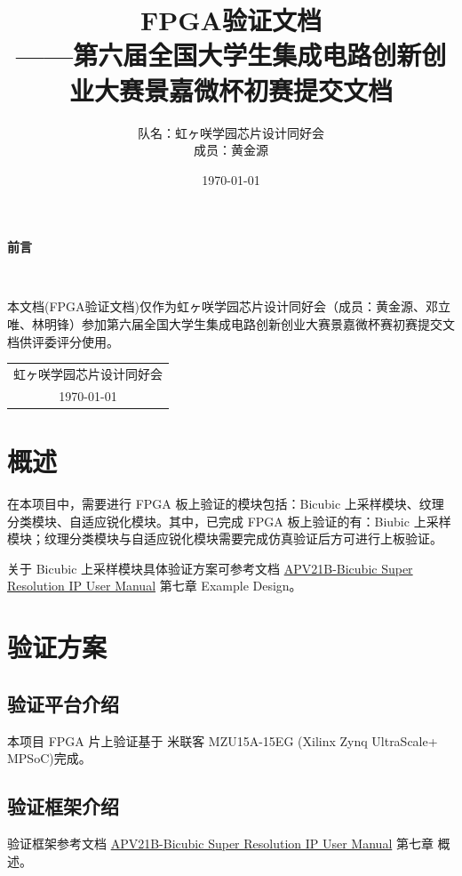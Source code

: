 \documentclass[12pt, a4paper, oneside]{ctexbook}
\title{{\Huge{\textbf{FPGA验证文档}}}\normalsize{\\——第六届全国大学生集成电路创新创业大赛景嘉微杯初赛提交文档}}
\author{队名：虹ヶ咲学园芯片设计同好会\\ 成员：黄金源\space邓立唯\space林明锋}
\date{\today}
\begin{document}
	
	\maketitle	
	\setcounter{page}{1}
	\begin{center}
		\Huge\textbf{前言}
	\end{center}~\
	
	本文档(FPGA验证文档)仅作为虹ヶ咲学园芯片设计同好会（成员：黄金源、邓立唯、林明锋）参加第六届全国大学生集成电路创新创业大赛景嘉微杯赛初赛提交文档供评委评分使用。
	~\\
	\begin{flushright}
		\begin{tabular}{c}
			虹ヶ咲学园芯片设计同好会\\
			\today
		\end{tabular}
	\end{flushright}
	\newpage
	\setcounter{page}{1}
	\tableofcontents
	\newpage
	\setcounter{page}{1}
	
	\chapter{概述}
    在本项目中，需要进行 FPGA 板上验证的模块包括：Bicubic 上采样模块、纹理分类模块、自适应锐化模块。其中，已完成 FPGA 板上验证的有：Biubic 上采样模块；纹理分类模块与自适应锐化模块需要完成仿真验证后方可进行上板验证。
    \par
    关于 Bicubic 上采样模块具体验证方案可参考文档 \href{../../00 IP User Manual (All Specs)/APV21B_Bicubic_Super_Resolution_IP_UM.pdf}{APV21B-Bicubic Super Resolution IP User Manual} 第七章 Example Design。

    \chapter{验证方案}
    \section{验证平台介绍}
    本项目 FPGA 片上验证基于 米联客 MZU15A-15EG (Xilinx Zynq UltraScale+ MPSoC)完成。
    \section{验证框架介绍}
    验证框架参考文档 \href{../../00 IP User Manual (All Specs)/APV21B_Bicubic_Super_Resolution_IP_UM.pdf}{APV21B-Bicubic Super Resolution IP User Manual} 第七章 概述。
\end{document}
